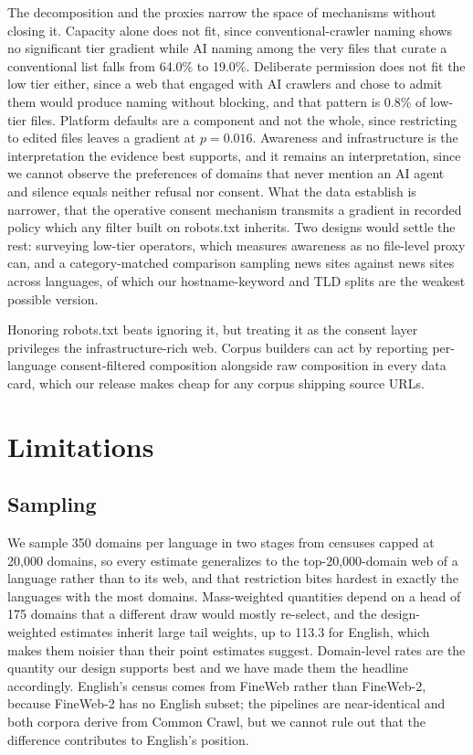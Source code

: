 \documentclass[11pt]{article}
\begin{document}
The decomposition and the proxies narrow the space of mechanisms without closing it. Capacity alone does not fit, since conventional-crawler naming shows no significant tier gradient while AI naming among the very files that curate a conventional list falls from 64.0\% to 19.0\%. Deliberate permission does not fit the low tier either, since a web that engaged with AI crawlers and chose to admit them would produce naming without blocking, and that pattern is 0.8\% of low-tier files. Platform defaults are a component and not the whole, since restricting to edited files leaves a gradient at $p = 0.016$. Awareness and infrastructure is the interpretation the evidence best supports, and it remains an interpretation, since we cannot observe the preferences of domains that never mention an AI agent and silence equals neither refusal nor consent. What the data establish is narrower, that the operative consent mechanism transmits a gradient in recorded policy which any filter built on robots.txt inherits. Two designs would settle the rest: surveying low-tier operators, which measures awareness as no file-level proxy can, and a category-matched comparison sampling news sites against news sites across languages, of which our hostname-keyword and TLD splits are the weakest possible version.

Honoring robots.txt beats ignoring it, but treating it as the consent layer privileges the infrastructure-rich web. Corpus builders can act by reporting per-language consent-filtered composition alongside raw composition in every data card, which our release makes cheap for any corpus shipping source URLs.

\section{Limitations}

\subsection{Sampling}

We sample 350 domains per language in two stages from censuses capped at 20,000 domains, so every estimate generalizes to the top-20,000-domain web of a language rather than to its web, and that restriction bites hardest in exactly the languages with the most domains. Mass-weighted quantities depend on a head of 175 domains that a different draw would mostly re-select, and the design-weighted estimates inherit large tail weights, up to 113.3 for English, which makes them noisier than their point estimates suggest. Domain-level rates are the quantity our design supports best and we have made them the headline accordingly. English's census comes from FineWeb rather than FineWeb-2, because FineWeb-2 has no English subset; the pipelines are near-identical and both corpora derive from Common Crawl, but we cannot rule out that the difference contributes to English's position.
\end{document}
